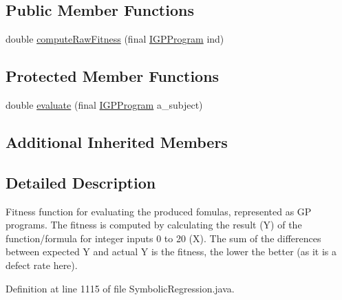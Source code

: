\subsection*{Public Member Functions}
\begin{DoxyCompactItemize}
\item 
double \hyperlink{classexamples_1_1gp_1_1symbolic_regression_1_1_symbolic_regression_1_1_formula_fitness_function_a71a94e8097da3bfb7fefe9e4e6846ad3}{compute\-Raw\-Fitness} (final \hyperlink{interfaceorg_1_1jgap_1_1gp_1_1_i_g_p_program}{I\-G\-P\-Program} ind)
\end{DoxyCompactItemize}
\subsection*{Protected Member Functions}
\begin{DoxyCompactItemize}
\item 
double \hyperlink{classexamples_1_1gp_1_1symbolic_regression_1_1_symbolic_regression_1_1_formula_fitness_function_a9a9bd9dc890a0bbcbc3c71f29a9927d8}{evaluate} (final \hyperlink{interfaceorg_1_1jgap_1_1gp_1_1_i_g_p_program}{I\-G\-P\-Program} a\-\_\-subject)
\end{DoxyCompactItemize}
\subsection*{Additional Inherited Members}


\subsection{Detailed Description}
Fitness function for evaluating the produced fomulas, represented as G\-P programs. The fitness is computed by calculating the result (Y) of the function/formula for integer inputs 0 to 20 (X). The sum of the differences between expected Y and actual Y is the fitness, the lower the better (as it is a defect rate here). 

Definition at line 1115 of file Symbolic\-Regression.\-java.



